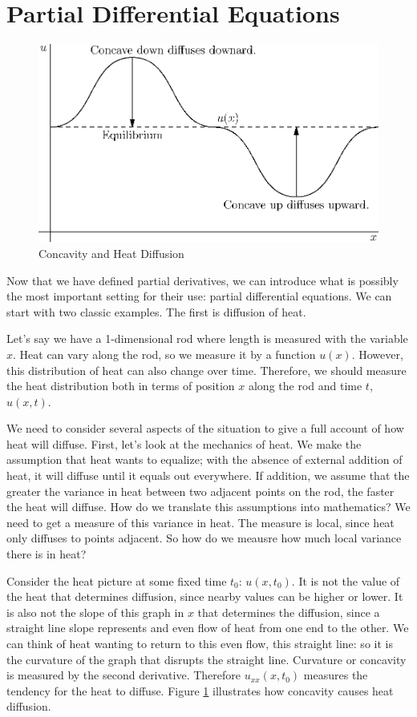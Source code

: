 \documentclass[fleqn,letterpaper]{report}
\begin{document}
\section{Partial Differential Equations}
\label{pdes}

\begin{figure}[ht]
\centering
\includegraphics[width=12cm]{figure39.eps}
\caption{Concavity and Heat Diffusion}
\label{figure-concavity-heat}
\end{figure}

Now that we have defined partial derivatives, we can introduce
what is possibly the most important setting for their use:
partial differential equations. We can start with two classic
examples. The first is diffusion of heat.

Let's say we have a 1-dimensional rod where length is measured
with the variable $x$. Heat can vary along the rod, so we
measure it by a function $u(x)$. However, this distribution of
heat can also change over time. Therefore, we should measure
the heat distribution both in terms of position $x$ along the
rod and time $t$, $u(x,t)$.

We need to consider several aspects of the situation to give a
full account of how heat will diffuse. First, let's look at
the mechanics of heat. We make the assumption that heat wants
to equalize; with the absence of external addition of heat, it
will diffuse until it equals out everywhere. If addition, we
assume that the greater the variance in heat between two
adjacent points on the rod, the faster the heat will diffuse.
How do we translate this assumptions into mathematics? We
need to get a measure of this variance in heat. The measure
is local, since heat only diffuses to points adjacent. So how
do we meausre how much local variance there is in heat? 

Consider the heat picture at some fixed time $t_0$:
$u(x,t_0)$. It is not the value of the heat that determines
diffusion, since nearby values can be higher or lower. It is
also not the slope of this graph in $x$ that determines the
diffusion, since a straight line slope represents and even
flow of heat from one end to the other. We can think of heat
wanting to return to this even flow, this straight line: so it
is the curvature of the graph that disrupts the straight line.
Curvature or concavity is measured by the second derivative.
Therefore $u_{xx}(x,t_0)$ measures the tendency for the heat to
diffuse. Figure \ref{figure-concavity-heat} illustrates how concavity
causes heat diffusion. 
\end{document}

